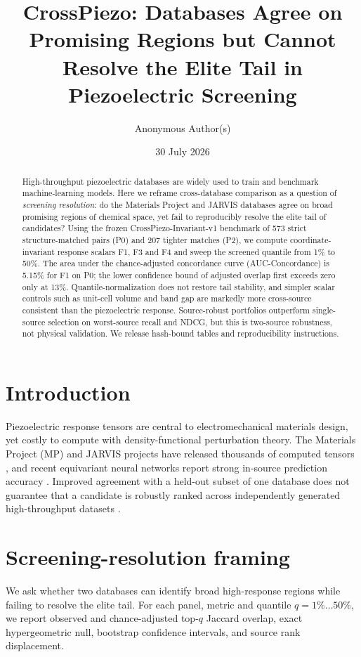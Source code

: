 \documentclass[11pt]{article}
\title{\textbf{CrossPiezo: Databases Agree on Promising Regions but Cannot Resolve the Elite Tail in Piezoelectric Screening}}
\author[1]{Anonymous Author(s)}
\affil[1]{Anonymous Institution}
\date{30 July 2026}
\begin{document}
\maketitle
\begin{abstract}
High-throughput piezoelectric databases are widely used to train and benchmark machine-learning models.
Here we reframe cross-database comparison as a question of \emph{screening resolution}: do the Materials Project and JARVIS databases agree on broad promising regions of chemical space, yet fail to reproducibly resolve the elite tail of candidates?
Using the frozen CrossPiezo-Invariant-v1 benchmark of 573 strict structure-matched pairs (P0) and 207 tighter matches (P2), we compute coordinate-invariant response scalars F1, F3 and F4 and sweep the screened quantile from 1\% to 50\%.
The area under the chance-adjusted concordance curve (AUC-Concordance) is 5.15\% for F1 on P0; the lower confidence bound of adjusted overlap first exceeds zero only at 13\%.
Quantile-normalization does not restore tail stability, and simpler scalar controls such as unit-cell volume and band gap are markedly more cross-source consistent than the piezoelectric response.
Source-robust portfolios outperform single-source selection on worst-source recall and NDCG, but this is two-source robustness, not physical validation.
We release hash-bound tables and reproducibility instructions.
\end{abstract}
\section{Introduction}
Piezoelectric response tensors are central to electromechanical materials design, yet costly to compute with density-functional perturbation theory.
The Materials Project (MP) and JARVIS projects have released thousands of computed tensors \cite{dejong2015,choudhary2020}, and recent equivariant neural networks report strong in-source prediction accuracy \cite{yan2024,dong2025}.
Improved agreement with a held-out subset of one database does not guarantee that a candidate is robustly ranked across independently generated high-throughput datasets \cite{hegde2023}.
\section{Screening-resolution framing}
We ask whether two databases can identify broad high-response regions while failing to resolve the elite tail.
For each panel, metric and quantile $q=1\%\ldots50\%$, we report observed and chance-adjusted top-$q$ Jaccard overlap, exact hypergeometric null, bootstrap confidence intervals, and source rank displacement.
\end{document}
